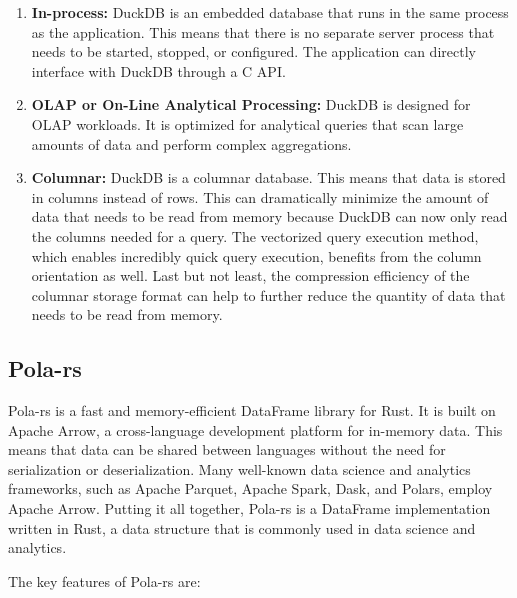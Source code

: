 \begin{enumerate}
    \itemsep0.5em
    \item \textbf{In-process:} DuckDB is an embedded database that runs in the same process as the application. This means that there is no separate server process that needs to be started, stopped, or configured. The application can directly interface with DuckDB through a C API.
    \item \textbf{OLAP or On-Line Analytical Processing:} DuckDB is designed for OLAP workloads. It is optimized for analytical queries that scan large amounts of data and perform complex aggregations.
    \item \textbf{Columnar:} DuckDB is a columnar database. This means that data is stored in columns instead of rows. This can dramatically minimize the amount of data that needs to be read from memory because DuckDB can now only read the columns needed for a query. The vectorized query execution method, which enables incredibly quick query execution, benefits from the column orientation as well. Last but not least, the compression efficiency of the columnar storage format can help to further reduce the quantity of data that needs to be read from memory.
\end{enumerate}

\subsection{Pola-rs}

Pola-rs is a fast and memory-efficient DataFrame library for Rust. It is built on Apache Arrow, a cross-language development platform for in-memory data. This means that data can be shared between languages without the need for serialization or deserialization. Many well-known data science and analytics frameworks, such as Apache Parquet, Apache Spark, Dask, and Polars, employ Apache Arrow. Putting it all together, Pola-rs is a DataFrame implementation written in Rust, a data structure that is commonly used in data science and analytics.

The key features of Pola-rs are:

